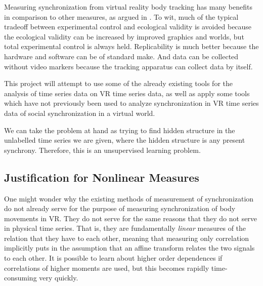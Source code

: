 \documentclass[12pt]{article}
\begin{document}
Measuring synchronization from virtual reality body tracking has many benefits in comparison to other measures, as argued in \cite{blascovich}. To wit, much of the typical tradeoff between experimental control and ecological validity is avoided because the ecological validity can be increased by improved graphics and worlds, but total experimental control is always held. Replicability is much better because the hardware and software can be of standard make. And data can be collected without video markers because the tracking apparatus can collect data by itself. \cite{blascovich}

This project will attempt to use some of the already existing tools for the analysis of time series data on VR time series data, as well as apply some tools which have not previously been used to analyze synchronization in VR time series data of social synchronization in a virtual world.

We can take the problem at hand as trying to find hidden structure in the unlabelled time series we are given, where the hidden structure is any present synchrony. Therefore, this is an unsupervised learning problem. %

\subsection{Justification for Nonlinear Measures}

One might wonder why the existing methods of measurement of synchronization do not already serve for the purpose of measuring synchronization of body movements in VR. They do not serve for the same reasons that they do not serve in physical time series. That is, they are fundamentally \emph{linear} measures of the relation that they have to each other, meaning that measuring only correlation implicitly puts in the assumption that an affine transform relates the two signals to each other. It is possible to learn about higher order dependences if correlations of higher moments are used, but this becomes rapidly time-consuming very quickly\cite{pompe}.
\end{document}
